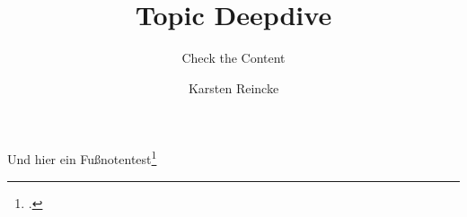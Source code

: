 \documentclass[
  DIV=calc,
  BCOR=5mm,
  11pt,
  headings=small,
  oneside,
  abstract=true,
  toc=bib,
  english,ngerman]{scrartcl}
\def\bibGl{../../../../bib.gl}
\def\cfgGl{../../../../cfg.gl/}
\def\cfgLf{../../../cfg.lf}
\begin{document}

\nocite{*}

\titlehead{Ausbildung zur Fachinformatikerin}
\subject{Release }
\title{Topic Deepdive}

\subtitle{Check the Content}
\author{Karsten Reincke}

\maketitle



Und hier ein Fußnotentest\footcite[vgl.][17]{RlpIt2019a}

\printbibliography


\printnomenclature
\end{document}
